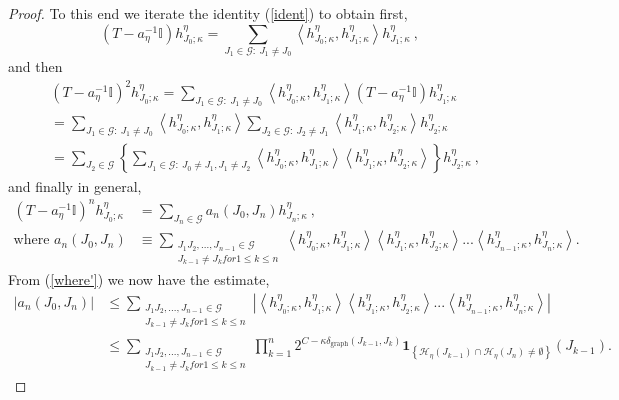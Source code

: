 \documentclass{amsart}%
\theoremstyle{plain}
\numberwithin{equation}{section}
\begin{document}
\begin{proof}
To this end we iterate the identity (\ref{ident}) to obtain first,%
\[
\left(  T-a_{\eta}^{-1}\mathbb{I}\right)  h_{J_{0};\kappa}^{\eta}=\sum
_{J_{1}\in\mathcal{G}:\ J_{1}\neq J_{0}}\left\langle h_{J_{0};\kappa}^{\eta
},h_{J_{1};\kappa}^{\eta}\right\rangle h_{J_{1};\kappa}^{\eta}\ ,
\]
and then%
\begin{align*}
& \left(  T-a_{\eta}^{-1}\mathbb{I}\right)  ^{2}h_{J_{0};\kappa}^{\eta}%
=\sum_{J_{1}\in\mathcal{G}:\ J_{1}\neq J_{0}}\left\langle h_{J_{0};\kappa
}^{\eta},h_{J_{1};\kappa}^{\eta}\right\rangle \left(  T-a_{\eta}%
^{-1}\mathbb{I}\right)  h_{J_{1};\kappa}^{\eta}\\
& =\sum_{J_{1}\in\mathcal{G}:\ J_{1}\neq J_{0}}\left\langle h_{J_{0};\kappa
}^{\eta},h_{J_{1};\kappa}^{\eta}\right\rangle \sum_{J_{2}\in\mathcal{G}%
:\ J_{2}\neq J_{1}}\left\langle h_{J_{1};\kappa}^{\eta},h_{J_{2};\kappa}%
^{\eta}\right\rangle h_{J_{2};\kappa}^{\eta}\\
& =\sum_{J_{2}\in\mathcal{G}}\left\{  \sum_{J_{1}\in\mathcal{G}:\ J_{0}\neq
J_{1},J_{1}\neq J_{2}}\left\langle h_{J_{0};\kappa}^{\eta},h_{J_{1};\kappa
}^{\eta}\right\rangle \left\langle h_{J_{1};\kappa}^{\eta},h_{J_{2};\kappa
}^{\eta}\right\rangle \right\}  h_{J_{2};\kappa}^{\eta}\ ,
\end{align*}
and finally in general,%
\begin{align*}
\left(  T-a_{\eta}^{-1}\mathbb{I}\right)  ^{n}h_{J_{0};\kappa}^{\eta}  &
=\sum_{J_{n}\in\mathcal{G}}a_{n}\left(  J_{0},J_{n}\right)  h_{J_{n};\kappa
}^{\eta}\ ,\\
\text{where }a_{n}\left(  J_{0},J_{n}\right)    & \equiv\sum_{\substack{J_{1}%
J_{2},...,J_{n-1}\in\mathcal{G}\\J_{k-1}\neq J_{k}for1\leq k\leq
n}}\left\langle h_{J_{0};\kappa}^{\eta},h_{J_{1};\kappa}^{\eta}\right\rangle
\left\langle h_{J_{1};\kappa}^{\eta},h_{J_{2};\kappa}^{\eta}\right\rangle
...\left\langle h_{J_{n-1};\kappa}^{\eta},h_{J_{n};\kappa}^{\eta}\right\rangle
.
\end{align*}
From (\ref{where'}) we now have the estimate,%
\begin{align}
\left\vert a_{n}\left(  J_{0},J_{n}\right)  \right\vert  & \leq\sum
_{\substack{J_{1}J_{2},...,J_{n-1}\in\mathcal{G}\\J_{k-1}\neq J_{k}for1\leq
k\leq n}}\left\vert \left\langle h_{J_{0};\kappa}^{\eta},h_{J_{1};\kappa
}^{\eta}\right\rangle \left\langle h_{J_{1};\kappa}^{\eta},h_{J_{2};\kappa
}^{\eta}\right\rangle ...\left\langle h_{J_{n-1};\kappa}^{\eta},h_{J_{n}%
;\kappa}^{\eta}\right\rangle \right\vert \label{from where'}\\
& \leq\sum_{\substack{J_{1}J_{2},...,J_{n-1}\in\mathcal{G}\\J_{k-1}\neq
J_{k}for1\leq k\leq n}}\prod_{k=1}^{n}2^{C-\kappa\delta_{\operatorname*{graph}%
}\left(  J_{k-1},J_{k}\right)  }\mathbf{1}_{\left\{  \mathcal{H}_{\eta}\left(
J_{k-1}\right)  \cap\mathcal{H}_{\eta}\left(  J_{n}\right)  \neq
\emptyset\right\}  }\left(  J_{k-1}\right)  .\nonumber
\end{align}



\end{proof}
\end{document}
